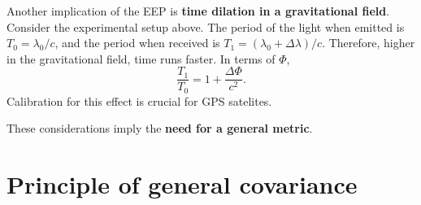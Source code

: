 \documentclass[11pt]{article}
\begin{document}
Another implication of the EEP is \textbf{time dilation in a gravitational field}.
Consider the experimental setup above.
The period of the light when emitted is $T_0 = \lambda_0/c$, and the period when received is $T_1 = (\lambda_0 + \Delta \lambda)/c$.
Therefore, higher in the gravitational field, time runs faster.
In terms of $\Phi$,
$$ \frac{T_1}{T_0} = 1 + \frac{\Delta \Phi}{c^2}. $$
Calibration for this effect is crucial for GPS satelites.

These considerations imply the \textbf{need for a general metric}.

\section{Principle of general covariance}
\end{document}

